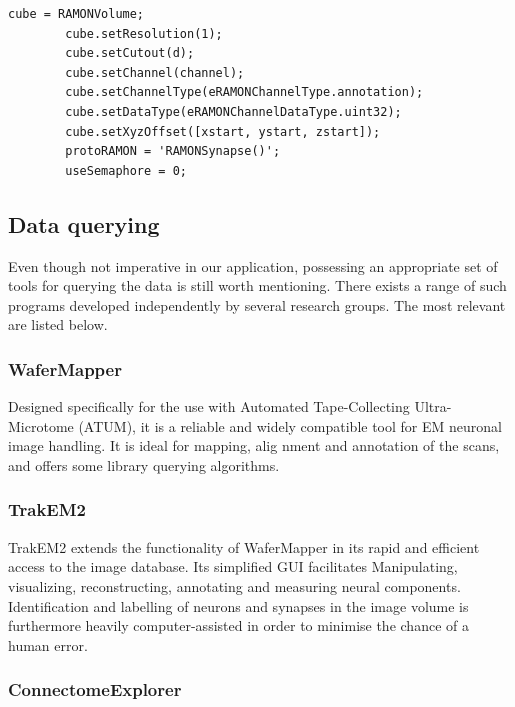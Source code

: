 \documentclass[a4paper, 11pt]{article}
\numberwithin{equation}{section}
\begin{document}
		\begin{lstlisting}[caption={Creating a RAMON object},label={lst:ramon}]
		cube = RAMONVolume;
		cube.setResolution(1);
		cube.setCutout(d);
		cube.setChannel(channel);
		cube.setChannelType(eRAMONChannelType.annotation);
		cube.setDataType(eRAMONChannelDataType.uint32);
		cube.setXyzOffset([xstart, ystart, zstart]);
		protoRAMON = 'RAMONSynapse()';
		useSemaphore = 0;
		\end{lstlisting}
		
		\subsection{Data querying}
		Even though not imperative in our application, possessing an appropriate set of tools for querying the data is still worth mentioning. There exists a range of such programs developed independently by several research groups. The most relevant are listed below.
		
		\subsubsection{WaferMapper}
		Designed specifically for the use with Automated Tape-Collecting Ultra-Microtome (ATUM), it is a reliable and widely compatible tool for EM neuronal image handling. It is ideal for mapping, alig nment and annotation of the scans, and offers some library querying algorithms. \cite{hayworth2014atum}
		
		\subsubsection{TrakEM2}
		TrakEM2 \cite{cardona2012trakem2} extends the functionality of WaferMapper in its rapid and efficient access to the image database. Its simplified GUI facilitates Manipulating, visualizing, reconstructing, annotating and measuring neural components. Identification and labelling of neurons and synapses in the image volume is furthermore heavily computer-assisted in order to minimise the chance of a human error.
		
		\subsubsection{ConnectomeExplorer}
		
\end{document}
